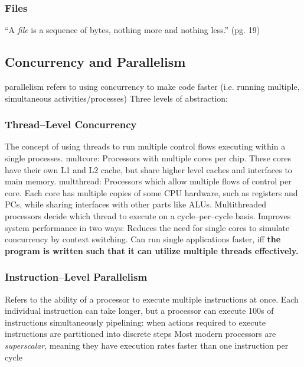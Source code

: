\documentclass[../bryant_comp_sys.tex]{subfiles}
\begin{document}
        \subsubsection{Files}
            \begin{outline}
                \1 ``A \textit{file} is a sequence of bytes, nothing more and nothing less.'' (pg. 19)
            \end{outline}

    \subsection{Concurrency and Parallelism}
        \begin{outline}
            \1 \Gls{parallelism} refers to using \gls{concurrency} to make code faster (i.e. running multiple, simultaneous activities/processes)
            \1 Three levels of abstraction:
        \end{outline}

        \subsubsection{Thread--Level Concurrency}
            \begin{outline}
                \1 The concept of using threads to run multiple control flows executing within a single processes.
                \1 \Gls{multcore}: Processors with multiple cores per chip.
                    \2 These cores have their own L1 and L2 cache, but share higher level caches and interfaces to main memory. 
                \1 \Gls{multthread}: Processors which allow multiple flows of control per core.
                    \2 Each core has multiple copies of some CPU hardware, such as registers and PCs, while sharing interfaces with other parts like ALUs.
                    \2 Multithreaded processors decide which thread to execute on a cycle--per--cycle basis.
                \1 Improves system performance in two ways:
                    \2 Reduces the need for single cores to simulate concurrency by context switching.
                    \2 Can run single applications faster, iff \textbf{the program is written such that it can utilize multiple threads effectively.}
            \end{outline}
        
        \subsubsection{Instruction--Level Parallelism}
            \begin{outline}
                \1 Refers to the ability of a processor to execute multiple instructions at once.
                \1 Each individual instruction can take longer, but a processor can execute 100s of instructions simultaneously
                \1 \Gls{pipelining}: when actions required to execute instructions are partitioned into discrete steps
                \1 Most modern processors are \textit{superscalar}, meaning they have execution rates faster than one instruction per cycle
            \end{outline}
\end{document}
